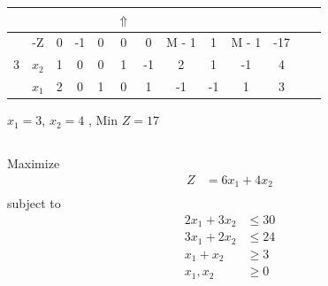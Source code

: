 \documentclass[12pt]{article}
\begin{document}
\begin{center}
\begin{tabular}{|c|c|c|c|cccccc|c|c|c|}
\hline
       &                    &      &      &              &  $\Uparrow$                        &                                   &                    &                                    &                                   &             &         &                \\
\hline
       &  -Z                &   0  &  -1  &           0  &  0                                 &                                0  &             M - 1  &                                 1  &                            M - 1  &        -17  &         &                \\
    3  &  $x_2$             &   1  &   0  &           0  &  1                                 &                               -1  &                 2  &                                 1  &                               -1  &          4  &         &                \\
       &  $x_1$             &   2  &   0  &           1  &  0                                 &                                1  &                -1  &                                -1  &                                1  &          3  &         &                \\
\hline
\end{tabular}
\end{center}



$x_1=3$, $x_2=4$ , Min $Z = 17$
\subsection{}

Maximize
\begin{align*}
Z         & =6x_1+4x_2 \\
\end{align*}
subject to
\begin{align*}
2x_1+3x_2 & \le 30     \\
3x_1+2x_2 & \le 24     \\
x_1+x_2   & \ge 3      \\
x_1,x_2   & \ge 0
\end{align*}
\end{document}
